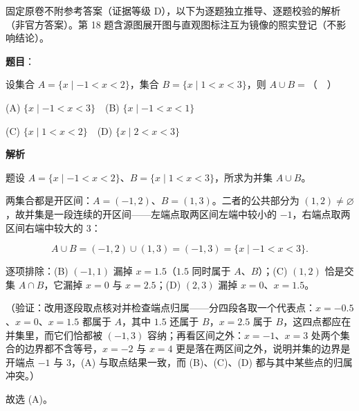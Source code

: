 
\begin{gktip}
固定原卷不附参考答案（证据等级 D），以下为逐题独立推导、逐题校验的解析（非官方答案）。第 18 题含源图展开图与直观图标注互为镜像的照实登记（不影响结论）。
\end{gktip}

\begin{answer}

\textbf{题目}：

设集合 \(A=\{x\mid -1<x<2\}\)，集合 \(B=\{x\mid 1<x<3\}\)，则 \(A\cup B=\)（　）

(A) \(\{x\mid -1<x<3\}\)　(B) \(\{x\mid -1<x<1\}\)

(C) \(\{x\mid 1<x<2\}\)　(D) \(\{x\mid 2<x<3\}\)

\textbf{解析}

题设 \(A=\{x\mid -1<x<2\}\)、\(B=\{x\mid 1<x<3\}\)，所求为并集 \(A\cup B\)。

两集合都是开区间：\(A=(-1,2)\)、\(B=(1,3)\)。二者的公共部分为 \((1,2)\neq\varnothing\)，故并集是一段连续的开区间——左端点取两区间左端中较小的 \(-1\)，右端点取两区间右端中较大的 \(3\)：

\nopagebreak[4]
\[
A\cup B=(-1,2)\cup(1,3)=(-1,3)=\{x\mid -1<x<3\}.
\]

逐项排除：(B) \((-1,1)\) 漏掉 \(x=1.5\)（\(1.5\) 同时属于 \(A\)、\(B\)）；(C) \((1,2)\) 恰是交集 \(A\cap B\)，它漏掉 \(x=0\) 与 \(x=2.5\)；(D) \((2,3)\) 漏掉 \(x=0\)、\(x=1.5\)。

（验证：改用逐段取点核对并检查端点归属——分四段各取一个代表点：\(x=-0.5\)、\(x=0\)、\(x=1.5\) 都属于 \(A\)，其中 \(1.5\) 还属于 \(B\)，\(x=2.5\) 属于 \(B\)，这四点都应在并集里，而它们恰都被 \((-1,3)\) 容纳；再看区间之外：\(x=-1\)、\(x=3\) 处两个集合的边界都不含等号，\(x=-2\) 与 \(x=4\) 更是落在两区间之外，说明并集的边界是开端点 \(-1\) 与 \(3\)，(A) 与取点结果一致，而 (B)、(C)、(D) 都与其中某些点的归属冲突。）

故选 (A)。


\end{answer}
